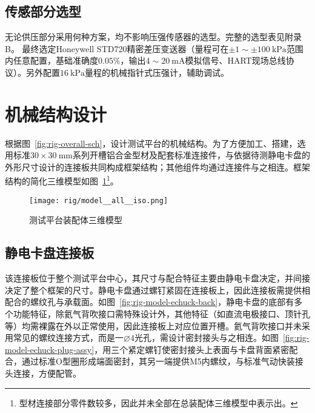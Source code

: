\subsection{传感部分选型}

无论供压部分采用何种方案，均不影响压强传感器的选型。完整的选型表见附录B。 %
最终选定Honeywell STD720精密差压变送器（量程可在$\pm \num{1} \sim \pm \SI{100}{\kilo\pascal}$范围内任意配置，基础准确度$0.05\%$，输出$\num{4} \sim \SI{20}{\milli\ampere}$模拟信号、HART现场总线协议）。另外配置$\SI{16}{\kilo\pascal}$量程的机械指针式压强计，辅助调试。



\clearpage



\section{机械结构设计}\label{sec:rig-model}

根据图~\ref{fig:rig-overall-sch}，设计测试平台的机械结构。为了方便加工、搭建，选用标准$\num{30} \times \SI{30}{\milli\meter}$系列开槽铝合金型材及配套标准连接件，与依据待测静电卡盘的外形尺寸设计的连接板共同构成框架结构；其他组件均通过连接件与之相连。框架结构的简化三维模型如图~\ref{fig:rig-model-all-iso}\footnote{型材连接部分零件数较多，因此并未全部在总装配体三维模型中表示出。}。

\begin{figure}[p]
\centering
\texttt{[image: rig/model\_\_all\_\_iso.png]}
\caption{测试平台装配体三维模型}
\label{fig:rig-model-all-iso}
\end{figure}


\subsection{静电卡盘连接板}\label{sec:rig-model-base}

该连接板位于整个测试平台中心，其尺寸与配合特征主要由静电卡盘决定，并间接决定了整个框架的尺寸。静电卡盘通过螺钉紧固在连接板上，因此连接板需提供相配合的螺纹孔与承载面。如图~\ref{fig:rig-model-echuck-back}\footnotemark{}，静电卡盘的底部有多个功能特征，除氦气背吹接口需特殊设计外，其他特征（如直流电极接口、顶针孔等）均需裸露在外以正常使用，因此连接板上对应位置开槽。氦气背吹接口并未采用常见的螺纹连接方式，而是一$\diameter{}4$光孔，需设计密封接头与之相连。如图~\ref{fig:rig-model-echuck-plug-assy}，用三个紧定螺钉使密封接头上表面与卡盘背面紧密配合，通过标准O型圈形成端面密封，其另一端提供M5内螺纹，与标准气动快装接头连接，方便配管。

